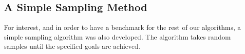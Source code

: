 \subsection{A Simple Sampling Method}
For interest, and in order to have a benchmark for the rest of our algorithms, a simple sampling algorithm was also developed. The algorithm takes random samples until the specified goals are achieved.
